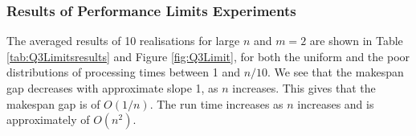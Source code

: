 \documentclass[12pt,a4paper,reqno]{article}
\begin{document}

\subsubsection{Results of Performance Limits Experiments}
The averaged results of 10 realisations for large $n$ and $m=2$ are shown in Table \ref{tab:Q3Limitsresults} and Figure \ref{fig:Q3Limit}, for both the uniform and the poor distributions of processing times between 1 and $n/10$. We see that the makespan gap decreases with approximate slope 1, as $n$ increases. This gives that the makespan gap is of $O(1/n)$. The run time increases as $n$ increases and is approximately of $O(n^2)$. \\
\end{document}
